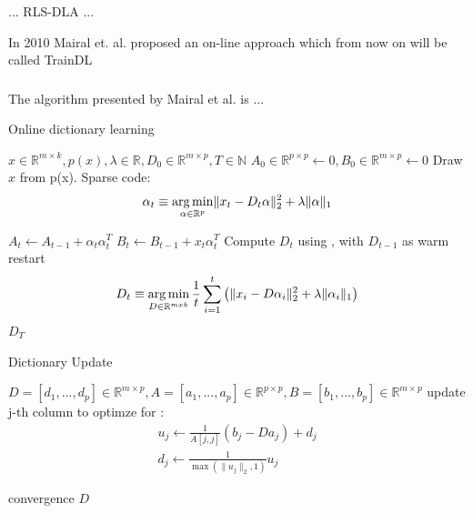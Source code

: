 ... RLS-DLA\cite{Engan2010} ...


In 2010 Mairal et. al.\cite{Mairal2010} proposed an on-line approach which from
now on will be called TrainDL

\subsubsection{\trainDL}
\label{sec:mairal}
The algorithm presented by Mairal et al.\cite{Mairal2010} is ...

\begin{algorithm}
\caption{Online dictionary learning\cite{Mairal2010}}
\begin{algorithmic}[1]
\REQUIRE $x \in \mathbb{R}^{m \times k},  p \left( x \right), \lambda \in \mathbb{R}, D_0 \in \mathbb{R}^{m \times p}, T \in \mathbb{N}$
\STATE $A_0 \in \mathbb{R}^{p \times p} \gets  0, B_0 \in \mathbb{R}^{m \times p}\gets 0$
\STATE Draw $x$ from p(x).
\STATE Sparse code:
\begin{align*} 
\alpha_t \equiv \operatorname*{arg\,min}_{\alpha\in\mathbb{R}^{p}}  \lVert x_t - D_t\alpha \rVert^{2}_{2}  +  \lambda \lVert \alpha \rVert_{1}
\end{align*}

\STATE $A_t \gets A_{t-1} + \alpha_t\alpha_t^T$
\STATE $B_t \gets B_{t-1} + x_t\alpha_t^T$
\STATE Compute $D_t$ using , with $D_{t-1}$ as warm restart 
\begin{align} 
D_t \equiv \operatorname*{arg\,min}_{D \in \mathbb{R}^{m x k}}  \frac{1}{t} \sum_{i=1}^t \left( \lVert x_i - D\alpha_i \rVert^{2}_{2}  +  \lambda \lVert \alpha_i \rVert_{1} \right) \label{eq:update}
\end{align}
\ENDFOR
\RETURN $D_T$
\end{algorithmic}
\end{algorithm}


\begin{algorithm}
\caption{Dictionary Update}
\label{alg:update}
\begin{algorithmic}[1]
\REQUIRE $D=[d_1,...,d_p] \in \mathbb{R}^{m \times p}, A=[a_1,...,a_p] \in \mathbb{R}^{p \times p}, B=[b_1,...,b_p] \in \mathbb{R}^{m \times p}$
\REPEAT
{}
\STATE update j-th column to optimze for :
\begin{align*}
u_j \gets \frac{1}{A[j,j]}\left(b_j-Da_j\right)+d_j \\
d_j \gets \frac{1}{\max\left(\lVert u_j \rVert_2,1\right)} u_j
\end{align*}

\ENDFOR
\UNTIL convergence 
\RETURN $D$
\end{algorithmic}
\end{algorithm}

